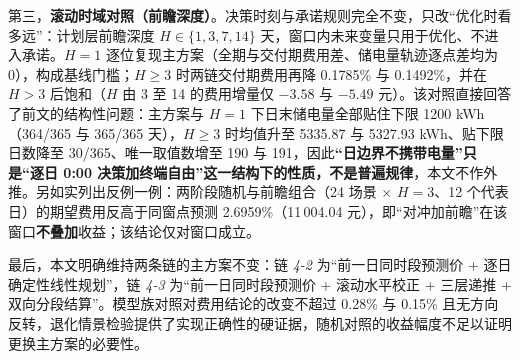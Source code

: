 第三，\textbf{滚动时域对照（前瞻深度）}。决策时刻与承诺规则完全不变，只改“优化时看多远”：计划层前瞻深度 $H\in\{1,3,7,14\}$ 天，窗口内未来变量只用于优化、不进入承诺。$H=1$ 逐位复现主方案（全期与交付期费用差、储电量轨迹逐点差均为 0），构成基线门槛；$H\ge3$ 时两链交付期费用再降 0.1785\% 与 0.1492\%，并在 $H>3$ 后饱和（$H$ 由 3 至 14 的费用增量仅 $-3.58$ 与 $-5.49$ 元）。该对照直接回答了前文的结构性问题：主方案与 $H=1$ 下日末储电量全部贴住下限 1200 kWh（364/365 与 365/365 天），$H\ge3$ 时均值升至 5335.87 与 5327.93 kWh、贴下限日数降至 30/365、唯一取值数增至 190 与 191，因此\textbf{“日边界不携带电量”只是“逐日 0:00 决策加终端自由”这一结构下的性质，不是普遍规律}，本文不作外推。另如实列出反例一例：两阶段随机与前瞻组合（24 场景 $\times$ $H=3$、12 个代表日）的期望费用反高于同窗点预测 2.6959\%（11\,004.04 元），即“对冲加前瞻”在该窗口\textbf{不叠加}收益；该结论仅对窗口成立。

最后，本文明确维持两条链的主方案不变：链 \emph{4-2} 为“前一日同时段预测价 + 逐日确定性线性规划”，链 \emph{4-3} 为“前一日同时段预测价 + 滚动水平校正 + 三层递推 + 双向分段结算”。模型族对照对费用结论的改变不超过 0.28\% 与 0.15\% 且无方向反转，退化情景检验提供了实现正确性的硬证据，随机对照的收益幅度不足以证明更换主方案的必要性。
